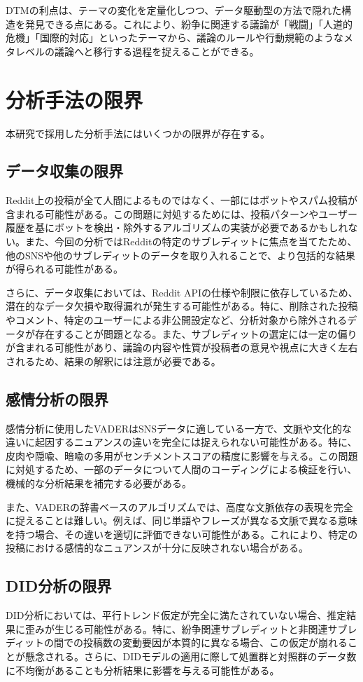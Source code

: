 \documentclass[11pt, a4j]{jreport}
\begin{document}
    DTMの利点は、テーマの変化を定量化しつつ、データ駆動型の方法で隠れた構造を発見できる点にある。これにより、紛争に関連する議論が「戦闘」「人道的危機」「国際的対応」といったテーマから、議論のルールや行動規範のようなメタレベルの議論へと移行する過程を捉えることができる。

    \section{分析手法の限界}
    本研究で採用した分析手法にはいくつかの限界が存在する。
    
    \subsection{データ収集の限界}
    Reddit上の投稿が全て人間によるものではなく、一部にはボットやスパム投稿が含まれる可能性がある。この問題に対処するためには、投稿パターンやユーザー履歴を基にボットを検出・除外するアルゴリズムの実装が必要であるかもしれない。また、今回の分析ではRedditの特定のサブレディットに焦点を当てたため、他のSNSや他のサブレディットのデータを取り入れることで、より包括的な結果が得られる可能性がある。
    
    さらに、データ収集においては、Reddit APIの仕様や制限に依存しているため、潜在的なデータ欠損や取得漏れが発生する可能性がある。特に、削除された投稿やコメント、特定のユーザーによる非公開設定など、分析対象から除外されるデータが存在することが問題となる。また、サブレディットの選定には一定の偏りが含まれる可能性があり、議論の内容や性質が投稿者の意見や視点に大きく左右されるため、結果の解釈には注意が必要である。
    
    \subsection{感情分析の限界}
    感情分析に使用したVADERはSNSデータに適している一方で、文脈や文化的な違いに起因するニュアンスの違いを完全には捉えられない可能性がある。特に、皮肉や隠喩、暗喩の多用がセンチメントスコアの精度に影響を与える。この問題に対処するため、一部のデータについて人間のコーディングによる検証を行い、機械的な分析結果を補完する必要がある。
    
    また、VADERの辞書ベースのアルゴリズムでは、高度な文脈依存の表現を完全に捉えることは難しい。例えば、同じ単語やフレーズが異なる文脈で異なる意味を持つ場合、その違いを適切に評価できない可能性がある。これにより、特定の投稿における感情的なニュアンスが十分に反映されない場合がある。
    
    \subsection{DID分析の限界}
    DID分析においては、平行トレンド仮定が完全に満たされていない場合、推定結果に歪みが生じる可能性がある。特に、紛争関連サブレディットと非関連サブレディットの間での投稿数の変動要因が本質的に異なる場合、この仮定が崩れることが懸念される。さらに、DIDモデルの適用に際して処置群と対照群のデータ数に不均衡があることも分析結果に影響を与える可能性がある。
\end{document}
